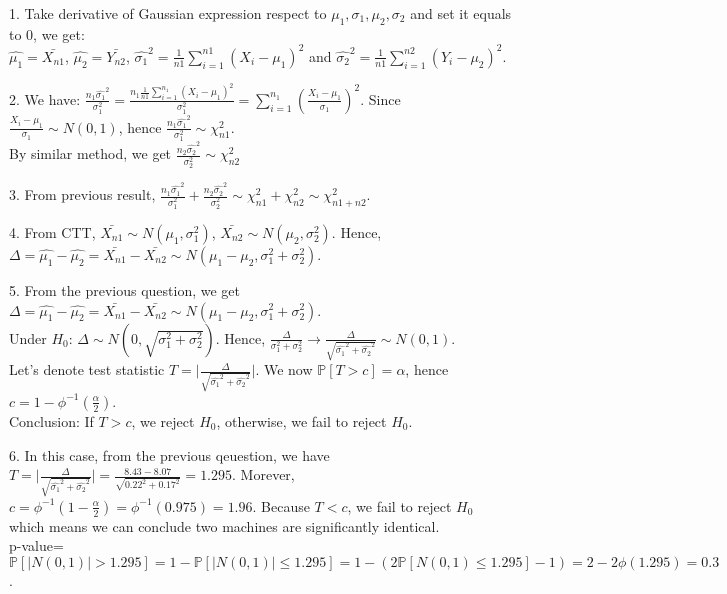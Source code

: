 \documentclass[10pt]{article}
\newenvironment{problem}[2][Problem]{\begin{trivlist}
\item[\hskip \labelsep {\bfseries #1}\hskip \labelsep {\bfseries #2.}]}{\end{trivlist}}
\begin{document}
\begin{problem}{2}
\item 1.
Take derivative of Gaussian expression respect to $\mu_1, \sigma_1, \mu_2, \sigma_2$ and set it equals to 0, we get:\\
$\hat{\mu_1}=\bar{X_{n1}}$, $\hat{\mu_2}=\bar{Y_{n2}}$, $\hat{\sigma_1}^2=\frac{1}{n1}\sum_{i=1}^{n1} (X_i-\mu_1)^2$ and $\hat{\sigma_2}^2=\frac{1}{n1}\sum_{i=1}^{n2} (Y_i-\mu_2)^2$.

\item 2.
We have: $\frac{n_1\hat{\sigma_1}^2}{\sigma_1^2}=\frac{n_1\frac{1}{n1}\sum_{i=1}^{n_1} (X_i-\mu_1)^2}{\sigma_1^2}=\sum_{i=1}^{n_1}(\frac{X_i-\mu_1}{\sigma_1})^2$. Since $\frac{X_i-\mu_1}{\sigma_1}\sim N(0,1)$, hence $\frac{n_1\hat{\sigma_1}^2}{\sigma_1^2} \sim \chi_{n1}^2$.\\
By similar method, we get $\frac{n_2\hat{\sigma_2}^2}{\sigma_2^2} \sim \chi_{n2}^2$






\item 3.
From previous result, $\frac{n_1\hat{\sigma_1}^2}{\sigma_1^2} + \frac{n_2\hat{\sigma_2}^2}{\sigma_2^2} \sim \chi_{n1}^2 + \chi_{n2}^2 \sim \chi_{n1+n2}^2$.


\item 4.
From CTT, $\bar{X_{n1}} \sim N(\mu_1, \sigma_1^2)$, $\bar{X_{n2}} \sim N(\mu_2, \sigma_2^2)$. Hence, $\Delta=\hat{\mu_1}-\hat{\mu_2}=\bar{X_{n1}}- \bar{X_{n2}} \sim N(\mu_1-\mu_2, \sigma_1^2+\sigma_2^2)$.


\item 5.
From the previous question, we get $\Delta=\hat{\mu_1}-\hat{\mu_2}=\bar{X_{n1}}- \bar{X_{n2}} \sim N(\mu_1-\mu_2, \sigma_1^2+\sigma_2^2)$.\\
Under $H_0$: $\Delta \sim N(0,\sqrt{ \sigma_1^2+\sigma_2^2})$. Hence, $\frac{\Delta}{\sigma_1^2+\sigma_2^2} \rightarrow \frac{\Delta}{\sqrt{\hat{\sigma_1}^2 + \hat{\sigma_2}^2}} \sim N(0,1)$.\\
Let's denote test statistic $T=\Big | \frac{\Delta}{\sqrt{\hat{\sigma_1}^2 + \hat{\sigma_2}^2}}\Big |$. We now $\mathbb{P}[T > c]=\alpha$, hence $c=1-\phi^{-1}(\frac{\alpha}{2})$.\\
Conclusion: If $T>c$, we reject $H_0$, otherwise, we fail to reject $H_0$.


\item 6.
In this case, from the previous qeuestion, we have $T=\Big | \frac{\Delta}{\sqrt{\hat{\sigma_1}^2 + \hat{\sigma_2}^2}}\Big |=\frac{8.43-8.07}{\sqrt{0.22^2+0.17^2}}=1.295$. Morever, $c=\phi^{-1}(1-\frac{\alpha}{2})=\phi^{-1}(0.975)=1.96$. Because $T<c$, we fail to reject $H_0$ which means we can conclude two machines are significantly identical.\\
p-value=$\mathbb{P}[|N(0,1)|>1.295]=1-\mathbb{P}[|N(0,1)| \leqslant 1.295]=1-(2\mathbb{P}[N(0,1) \leqslant 1.295]-1)=2-2\phi(1.295)=0.3$.




\end{problem}
\end{document}
